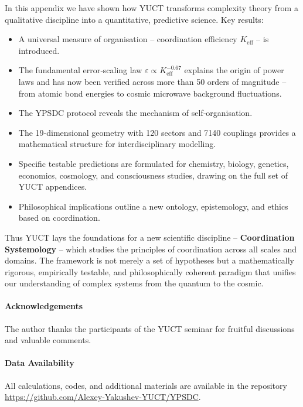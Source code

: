 \documentclass[11pt]{article}
\theoremstyle{remark}
\newcommand{\Keff}{K_{\mathrm{eff}}}
\begin{document}
	In this appendix we have shown how YUCT transforms complexity theory from a qualitative discipline into a quantitative, predictive science. Key results:
	\begin{itemize}
		\item A universal measure of organisation – coordination efficiency $\Keff$ – is introduced.
		\item The fundamental error‑scaling law $\varepsilon \propto \Keff^{-0.67}$ explains the origin of power laws and has now been verified across more than 50 orders of magnitude – from atomic bond energies to cosmic microwave background fluctuations.
		\item The YPSDC protocol reveals the mechanism of self‑organisation.
		\item The 19‑dimensional geometry with 120 sectors and 7140 couplings provides a mathematical structure for interdisciplinary modelling.
		\item Specific testable predictions are formulated for chemistry, biology, genetics, economics, cosmology, and consciousness studies, drawing on the full set of YUCT appendices.
		\item Philosophical implications outline a new ontology, epistemology, and ethics based on coordination.
	\end{itemize}
	
	Thus YUCT lays the foundations for a new scientific discipline – \textbf{Coordination Systemology} – which studies the principles of coordination across all scales and domains. The framework is not merely a set of hypotheses but a mathematically rigorous, empirically testable, and philosophically coherent paradigm that unifies our understanding of complex systems from the quantum to the cosmic.
	
	\paragraph*{Acknowledgements}
	The author thanks the participants of the YUCT seminar for fruitful discussions and valuable comments.
	
	\paragraph*{Data Availability}
	All calculations, codes, and additional materials are available in the repository \url{https://github.com/Alexey-Yakushev-YUCT/YPSDC}.
	
\end{document}
